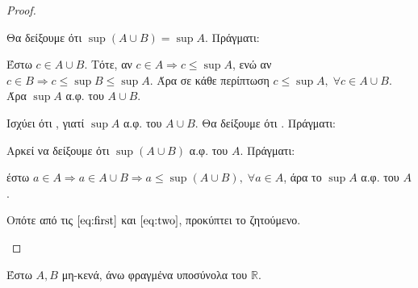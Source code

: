 \begin{proof}
\begin{enumerate}
            Θα δείξουμε ότι $ \sup (A \cup B) = \sup A $. Πράγματι:

            Έστω $ c \in A \cup B $. Τότε, αν $ c \in A \Rightarrow c \leq 
            \sup A$, ενώ αν $ c \in B \Rightarrow c \leq \sup B \leq \sup A $. 
            Άρα σε κάθε περίπτωση $ c \leq \sup A, \; \forall c \in A \cup 
            B$. Άρα $ \sup A $ α.φ. του $ A \cup B $.

            Ισχύει ότι , γιατί $ \sup A $ α.φ. 
            του $ A \cup B $. Θα δείξουμε ότι .
            Πράγματι: 

            Αρκεί να δείξουμε ότι $ \sup (A \cup B) $ α.φ. του $A$. Πράγματι:

            έστω $ a \in A \Rightarrow a \in A \cup B \Rightarrow a \leq \sup 
            (A \cup B), \; \forall a \in A$, άρα το $ \sup A $ α.φ. του $A$.

            Οπότε από τις $ \eqref{eq:first} $ και $ \eqref{eq:two} $, 
            προκύπτει το ζητούμενο.
        \end{enumerate}
      \end{proof}

    \item \textcolor{Col1}{Έστω $ A, B $ μη-κενά, άνω φραγμένα υποσύνολα του
      $ \mathbb{R} $.}


